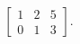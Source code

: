 \documentclass{article}
\begin{document}
\[
\left[
\begin{array}{cc|c}
  1&2&5\\
  0&1&3
\end{array}
\right].
\]
\end{document}
